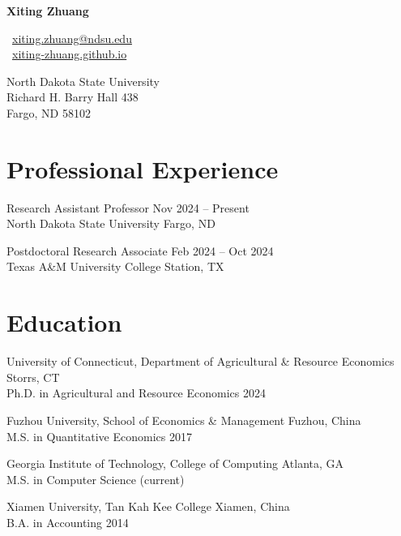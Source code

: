 \documentclass[10.5pt,letterpaper]{article}
\def\name{Xiting Zhuang}
\renewenvironment{itemize}{
	\begin{list}{}{
			\setlength{\leftmargin}{1.5em}
		}
	}{
	\end{list}
}
\begin{document}
	
	{\huge \textbf{\name}}
	
	\vspace{0.25in}
	
 

\noindent
\begin{minipage}[t]{0.50\textwidth}
	\faEnvelope\ \href{mailto:xiting.zhuang@ndsu.edu}{xiting.zhuang@ndsu.edu} \\
	\faGlobe\ \href{https://xiting-zhuang.github.io}{xiting-zhuang.github.io}
\end{minipage}\hfill
\begin{minipage}[t]{0.47\textwidth}
	\raggedleft
	North Dakota State University \\
	Richard H. Barry Hall 438 \\
	Fargo, ND 58102
\end{minipage}

	
	\section*{\textbf{Professional Experience}}
	
	\begin{itemize}
		
		\item[-]  Research Assistant Professor \hfill Nov 2024 – Present \\
		North Dakota State University   \hfill Fargo, ND  
		
		\item[-]  Postdoctoral Research Associate  \hfill Feb 2024 – Oct 2024 \\
		Texas A\&M University \hfill College Station, TX
		
 
		
	\end{itemize}
	
	\section*{\textbf{Education}}
	\begin{itemize}
		\item[-] University of Connecticut, Department of Agricultural \& Resource Economics \hfill Storrs, CT \\
		Ph.D. in Agricultural and Resource Economics  \hfill 2024
		
		\item[-] Fuzhou University, School of Economics \& Management \hfill Fuzhou, China \\
		M.S. in Quantitative Economics \hfill 2017
		
		\item[-] Georgia Institute of Technology, College of Computing \hfill Atlanta, GA \\
		M.S. in Computer Science (current)
		
		\item[-] Xiamen University, Tan Kah Kee College \hfill Xiamen, China \\
		B.A. in Accounting \hfill 2014
	\end{itemize}
	
\end{document}
